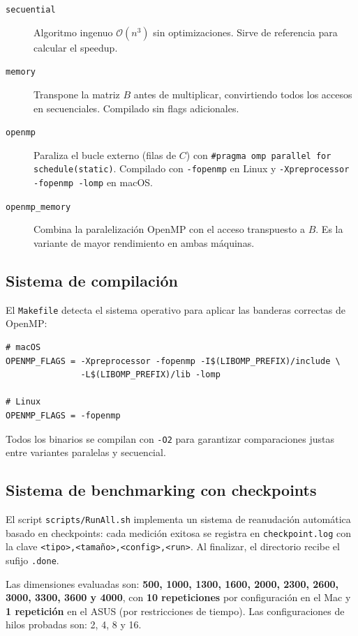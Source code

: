 \documentclass{article}
\begin{document}
\begin{description}
    \item[\texttt{secuential}] Algoritmo ingenuo $\mathcal{O}(n^3)$ sin optimizaciones. Sirve de referencia para calcular el speedup.
    \item[\texttt{memory}] Transpone la matriz $B$ antes de multiplicar, convirtiendo todos los accesos en secuenciales. Compilado sin flags adicionales.
    \item[\texttt{openmp}] Paraliza el bucle externo (filas de $C$) con \texttt{\#pragma omp parallel for schedule(static)}. Compilado con \texttt{-fopenmp} en Linux y \texttt{-Xpreprocessor -fopenmp -lomp} en macOS.
    \item[\texttt{openmp\_memory}] Combina la paralelización OpenMP con el acceso transpuesto a $B$. Es la variante de mayor rendimiento en ambas máquinas.
\end{description}

\subsection{Sistema de compilación}

El \texttt{Makefile} detecta el sistema operativo para aplicar las banderas correctas de OpenMP:

\begin{lstlisting}
# macOS
OPENMP_FLAGS = -Xpreprocessor -fopenmp -I$(LIBOMP_PREFIX)/include \
               -L$(LIBOMP_PREFIX)/lib -lomp

# Linux
OPENMP_FLAGS = -fopenmp
\end{lstlisting}

Todos los binarios se compilan con \texttt{-O2} para garantizar comparaciones justas entre variantes paralelas y secuencial.

\subsection{Sistema de benchmarking con checkpoints}

El script \texttt{scripts/RunAll.sh} implementa un sistema de reanudación automática basado en checkpoints: cada medición exitosa se registra en \texttt{checkpoint.log} con la clave \texttt{<tipo>,<tamaño>,<config>,<run>}. Al finalizar, el directorio recibe el sufijo \texttt{.done}.

Las dimensiones evaluadas son: \textbf{500, 1000, 1300, 1600, 2000, 2300, 2600, 3000, 3300, 3600 y 4000}, con \textbf{10 repeticiones} por configuración en el Mac y \textbf{1 repetición} en el ASUS (por restricciones de tiempo). Las configuraciones de hilos probadas son: 2, 4, 8 y 16.
\end{document}
